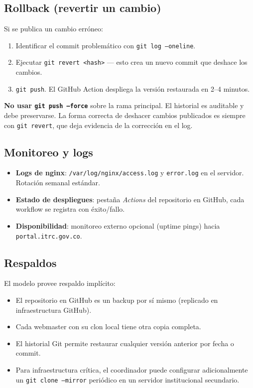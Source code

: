 \documentclass[11pt,a4paper]{article}
\begin{document}
\subsection{Rollback (revertir un cambio)}

Si se publica un cambio erróneo:
\begin{enumerate}[leftmargin=*]
  \item Identificar el commit problemático con \texttt{git log --oneline}.
  \item Ejecutar \texttt{git revert <hash>} — esto crea un nuevo commit que deshace los cambios.
  \item \texttt{git push}. El GitHub Action despliega la versión restaurada en 2–4 minutos.
\end{enumerate}

\begin{warnbox}[title=Nunca forzar el historial]
\textbf{No usar \texttt{git push --force}} sobre la rama principal. El historial es auditable y debe preservarse. La forma correcta de deshacer cambios publicados es siempre con \texttt{git revert}, que deja evidencia de la corrección en el log.
\end{warnbox}

\subsection{Monitoreo y logs}

\begin{itemize}[leftmargin=*]
  \item \textbf{Logs de nginx}: \texttt{/var/log/nginx/access.log} y \texttt{error.log} en el servidor. Rotación semanal estándar.
  \item \textbf{Estado de despliegues}: pestaña \textit{Actions} del repositorio en GitHub, cada workflow se registra con éxito/fallo.
  \item \textbf{Disponibilidad}: monitoreo externo opcional (uptime pings) hacia \texttt{portal.itrc.gov.co}.
\end{itemize}

\subsection{Respaldos}

El modelo provee respaldo implícito:
\begin{itemize}[leftmargin=*]
  \item El repositorio en GitHub es un backup por sí mismo (replicado en infraestructura GitHub).
  \item Cada webmaster con su clon local tiene otra copia completa.
  \item El historial Git permite restaurar cualquier versión anterior por fecha o commit.
  \item Para infraestructura crítica, el coordinador puede configurar adicionalmente un \texttt{git clone --mirror} periódico en un servidor institucional secundario.
\end{itemize}
\end{document}
